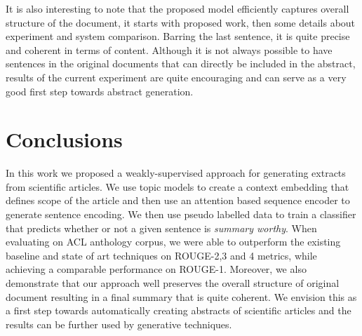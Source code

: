 \vspace{-4mm}
It is also interesting to note that the proposed model efficiently captures overall structure of the document, it starts with proposed work, then some details about experiment and system comparison. Barring the last sentence, it is quite precise and coherent in terms of content. Although it is not always possible to have sentences in the original documents that can directly be included in the abstract, results of the current experiment are quite encouraging and can serve as a very good first step towards abstract generation. 

\section{Conclusions}

In this work we proposed a weakly-supervised approach for generating extracts from scientific articles. We use topic models to create a context embedding that defines scope of the article and then use an attention based sequence encoder to generate sentence encoding. We then use pseudo labelled data to train a classifier that predicts whether or not a given sentence is \emph{summary worthy}. When evaluating on ACL anthology corpus, we were able to outperform the existing baseline and state of art techniques on ROUGE-2,3 and 4 metrics, while achieving a comparable performance on ROUGE-1. Moreover, we also demonstrate that our approach well preserves the overall structure of original document resulting in a final summary that is quite coherent. We envision this as a first step towards automatically creating abstracts of scientific articles and the results can be further used by generative techniques.

